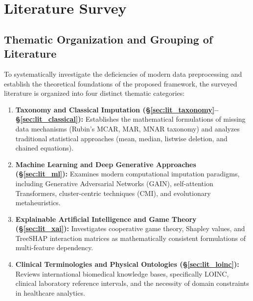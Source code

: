 \documentclass[MTech]{ugthesis}
\begin{document}
\chapter{Literature Survey}
\label{chap:lit}

\section*{Thematic Organization and Grouping of Literature}
To systematically investigate the deficiencies of modern data preprocessing and establish the theoretical foundations of the proposed framework, the surveyed literature is organized into four distinct thematic categories:
\begin{enumerate}
    \item \textbf{Taxonomy and Classical Imputation (\S\ref{sec:lit_taxonomy}--\S\ref{sec:lit_classical}):} Establishes the mathematical formulations of missing data mechanisms (Rubin's MCAR, MAR, MNAR taxonomy) and analyzes traditional statistical approaches (mean, median, listwise deletion, and chained equations).
    \item \textbf{Machine Learning and Deep Generative Approaches (\S\ref{sec:lit_ml}):} Examines modern computational imputation paradigms, including Generative Adversarial Networks (\ac{GAIN}), self-attention Transformers, cluster-centric techniques (\ac{CMI}), and evolutionary metaheuristics.
    \item \textbf{Explainable Artificial Intelligence and Game Theory (\S\ref{sec:lit_xai}):} Investigates cooperative game theory, Shapley values, and Tree\ac{SHAP} interaction matrices as mathematically consistent formulations of multi-feature dependency.
    \item \textbf{Clinical Terminologies and Physical Ontologies (\S\ref{sec:lit_loinc}):} Reviews international biomedical knowledge bases, specifically \ac{LOINC}, clinical laboratory reference intervals, and the necessity of domain constraints in healthcare analytics.
\end{enumerate}
\end{document}
